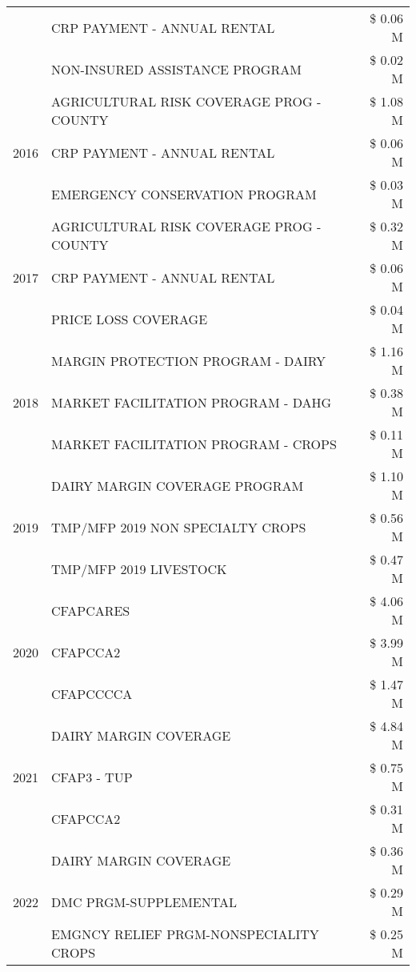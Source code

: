 \begin{tabular}{llr}
 & CRP PAYMENT - ANNUAL RENTAL & \$ 0.06 M \\
 & NON-INSURED ASSISTANCE PROGRAM & \$ 0.02 M \\
\cline{1-3}
\multirow[t]{3}{*}{2016} & AGRICULTURAL RISK COVERAGE PROG - COUNTY & \$ 1.08 M \\
 & CRP PAYMENT - ANNUAL RENTAL & \$ 0.06 M \\
 & EMERGENCY CONSERVATION PROGRAM & \$ 0.03 M \\
\cline{1-3}
\multirow[t]{3}{*}{2017} & AGRICULTURAL RISK COVERAGE PROG - COUNTY & \$ 0.32 M \\
 & CRP PAYMENT - ANNUAL RENTAL & \$ 0.06 M \\
 & PRICE LOSS COVERAGE & \$ 0.04 M \\
\cline{1-3}
\multirow[t]{3}{*}{2018} & MARGIN PROTECTION PROGRAM - DAIRY & \$ 1.16 M \\
 & MARKET FACILITATION PROGRAM - DAHG & \$ 0.38 M \\
 & MARKET FACILITATION PROGRAM - CROPS & \$ 0.11 M \\
\cline{1-3}
\multirow[t]{3}{*}{2019} & DAIRY MARGIN COVERAGE PROGRAM & \$ 1.10 M \\
 & TMP/MFP 2019 NON SPECIALTY CROPS & \$ 0.56 M \\
 & TMP/MFP 2019 LIVESTOCK & \$ 0.47 M \\
\cline{1-3}
\multirow[t]{3}{*}{2020} & CFAPCARES & \$ 4.06 M \\
 & CFAPCCA2 & \$ 3.99 M \\
 & CFAPCCCCA & \$ 1.47 M \\
\cline{1-3}
\multirow[t]{3}{*}{2021} & DAIRY MARGIN COVERAGE & \$ 4.84 M \\
 & CFAP3 - TUP & \$ 0.75 M \\
 & CFAPCCA2 & \$ 0.31 M \\
\cline{1-3}
\multirow[t]{3}{*}{2022} & DAIRY MARGIN COVERAGE & \$ 0.36 M \\
 & DMC PRGM-SUPPLEMENTAL & \$ 0.29 M \\
 & EMGNCY RELIEF PRGM-NONSPECIALITY CROPS & \$ 0.25 M \\
\cline{1-3}
\bottomrule
\end{tabular}
